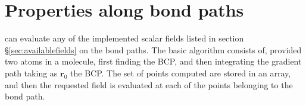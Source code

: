 \section{Properties along bond paths}

\DTK{} can evaluate any of the implemented scalar fields listed in section \S\ref{sec:availablefields} on the bond paths. The basic algorithm consists of, provided two atoms in a molecule, first finding the BCP, and then integrating the gradient path taking as $\boldsymbol{r}_0$ the BCP. The set of points computed are stored in an array, and then the requested field is evaluated at each of the points belonging to the bond path.











